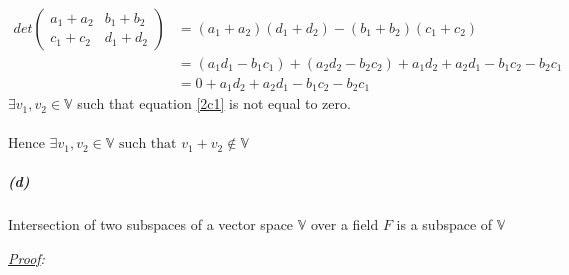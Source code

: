 \documentclass[12pt, letterpaper]{article}
\begin{document}
\begin{enumerate}
\[\begin{split}
    \end{split}
  \]
  \begin{equation}
    \label{2c1}
    \begin{split}
    det\begin{pmatrix}a_1 + a_2 &b_1 + b_2\\c_1 + c_2 &d_1 + d_2\end{pmatrix}
    &= (a_1 + a_2)(d_1 + d_2) - (b_1 + b_2)(c_1 + c_2)\\
    &= (a_1d_1 - b_1c_1) + (a_2d_2 - b_2c_2) + a_1d_2 + a_2d_1 -b_1c_2 -b_2c_1\\
    &= 0 + a_1d_2 + a_2d_1 -b_1c_2 -b_2c_1
    \end{split}
  \end{equation}
  $\exists v_1, v_2 \in \mathbb{V}$ such that equation \ref{2c1} is not equal to zero.\\\\
  Hence $\boxed{\exists v_1,v_2 \in \mathbb{V}\text{ such that }v_1 + v_2 \not \in \mathbb{V}}$
\end{enumerate}

\subparagraph{(d)} Intersection of two subspaces of a vector space $\mathbb{V}$ over a field $F$ is a subspace of $\mathbb{V}$

\textit{\underline{Proof}:}\\
\end{document}
